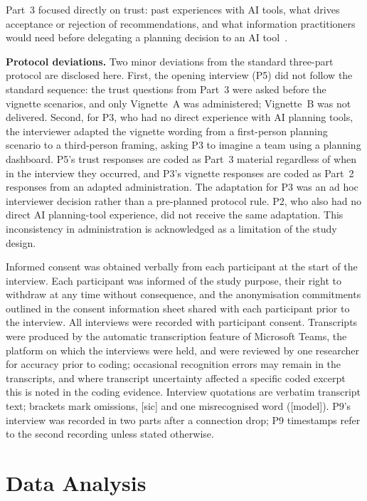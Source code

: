 \documentclass[a4paper,twoside]{bth}
\begin{document}
Part~3 focused directly on trust: past experiences with AI tools, what drives acceptance or rejection of recommendations, and what information practitioners would need before delegating a planning decision to an AI tool~\cite{lee2004trust, bao2021investigating}.

\textbf{Protocol deviations.} Two minor deviations from the standard three-part protocol are disclosed here. First, the opening interview (P5) did not follow the standard sequence: the trust questions from Part~3 were asked before the vignette scenarios, and only Vignette~A was administered; Vignette~B was not delivered. Second, for P3, who had no direct experience with AI planning tools, the interviewer adapted the vignette wording from a first-person planning scenario to a third-person framing, asking P3 to imagine a team using a planning dashboard. P5's trust responses are coded as Part~3 material regardless of when in the interview they occurred, and P3's vignette responses are coded as Part~2 responses from an adapted administration. The adaptation for P3 was an ad hoc interviewer decision rather than a pre-planned protocol rule. P2, who also had no direct AI planning-tool experience, did not receive the same adaptation. This inconsistency in administration is acknowledged as a limitation of the study design.

Informed consent was obtained verbally from each participant at the start of the interview. Each participant was informed of the study purpose, their right to withdraw at any time without consequence, and the anonymisation commitments outlined in the consent information sheet shared with each participant prior to the interview. All interviews were recorded with participant consent. Transcripts were produced by the automatic transcription feature of Microsoft Teams, the platform on which the interviews were held, and were reviewed by one researcher for accuracy prior to coding; occasional recognition errors may remain in the transcripts, and where transcript uncertainty affected a specific coded excerpt this is noted in the coding evidence. Interview quotations are verbatim transcript text; brackets mark omissions, [sic] and one misrecognised word ([model]). P9's interview was recorded in two parts after a connection drop; P9 timestamps refer to the second recording unless stated otherwise.

\section{Data Analysis}
\label{sec:analysis}
\end{document}
